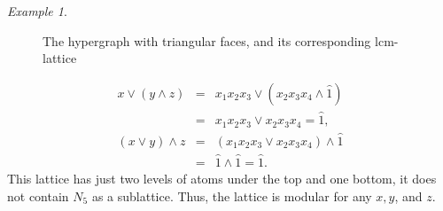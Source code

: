 \documentclass[11pt]{amsart}
\newcommand{\lcm}{\mathrm{lcm}}
\theoremstyle{plain}
\numberwithin{lemma}{\DefaultNumberTheoremWithin}
\numberwithin{claim}{\DefaultNumberTheoremWithin}
\numberwithin{theorem}{\DefaultNumberTheoremWithin}
\numberwithin{corollary}{\DefaultNumberTheoremWithin}
\numberwithin{proposition}{\DefaultNumberTheoremWithin}
\numberwithin{conjecture}{\DefaultNumberTheoremWithin}
\theoremstyle{definition}
\numberwithin{definition}{\DefaultNumberTheoremWithin}
\theoremstyle{definition}
\numberwithin{question}{\DefaultNumberTheoremWithin}
\theoremstyle{definition}
\numberwithin{problem}{\DefaultNumberTheoremWithin}
\theoremstyle{remark}
\numberwithin{remark}
     {\DefaultNumberTheoremWithin}
\theoremstyle{remark}
\newtheorem{example}{Example}
\numberwithin{example}{\DefaultNumberTheoremWithin}
\begin{document}
\begin{example}
\begin{figure}[h]
\begin{minipage}{0.55\textwidth}
\vspace{0.2cm}
\end{minipage}
\caption{The hypergraph with triangular faces, and its corresponding $\lcm$- lattice}\label{F7}
\end{figure}
    \begin{eqnarray}
     \nonumber x \vee (y \wedge z) &=& x_1x_2x_3 \vee(x_2x_3x_4\wedge \hat{1})\\ 
     \nonumber   &=& x_1x_2x_3\vee x_2x_3x_4 =\hat{1},\\
     \nonumber (x \vee y) \wedge z &=& (x_1x_2x_3 \vee x_2x_3x_4)\wedge \hat{1}\\ 
     \nonumber  &=&  \hat{1}\wedge \hat{1}=\hat{1}.
     \end{eqnarray}
     This lattice has just two levels of atoms under the top and one bottom, it does not contain $N_5$ as a sublattice. Thus, the lattice is modular for any $x,y$, and $z$.
\end{example}


  


   

\end{document}
